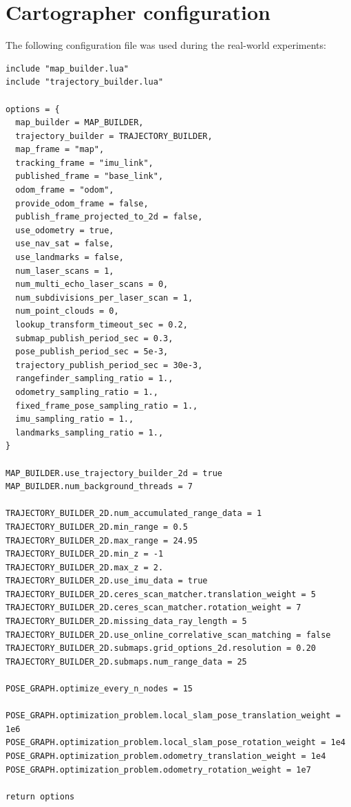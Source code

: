 
\appendix

\chapter{Cartographer configuration} \label{app:cartographer}
\setcounter{page}{1}

The following configuration file was used during the real-world experiments:

\begin{lstlisting}
include "map_builder.lua"
include "trajectory_builder.lua"

options = {
  map_builder = MAP_BUILDER,
  trajectory_builder = TRAJECTORY_BUILDER,
  map_frame = "map",
  tracking_frame = "imu_link",
  published_frame = "base_link",
  odom_frame = "odom",
  provide_odom_frame = false,
  publish_frame_projected_to_2d = false,
  use_odometry = true,
  use_nav_sat = false,
  use_landmarks = false,
  num_laser_scans = 1,
  num_multi_echo_laser_scans = 0,
  num_subdivisions_per_laser_scan = 1,
  num_point_clouds = 0,
  lookup_transform_timeout_sec = 0.2,
  submap_publish_period_sec = 0.3,
  pose_publish_period_sec = 5e-3,
  trajectory_publish_period_sec = 30e-3,
  rangefinder_sampling_ratio = 1.,
  odometry_sampling_ratio = 1.,
  fixed_frame_pose_sampling_ratio = 1.,
  imu_sampling_ratio = 1.,
  landmarks_sampling_ratio = 1.,
}

MAP_BUILDER.use_trajectory_builder_2d = true
MAP_BUILDER.num_background_threads = 7

TRAJECTORY_BUILDER_2D.num_accumulated_range_data = 1
TRAJECTORY_BUILDER_2D.min_range = 0.5
TRAJECTORY_BUILDER_2D.max_range = 24.95
TRAJECTORY_BUILDER_2D.min_z = -1
TRAJECTORY_BUILDER_2D.max_z = 2.
TRAJECTORY_BUILDER_2D.use_imu_data = true
TRAJECTORY_BUILDER_2D.ceres_scan_matcher.translation_weight = 5
TRAJECTORY_BUILDER_2D.ceres_scan_matcher.rotation_weight = 7
TRAJECTORY_BUILDER_2D.missing_data_ray_length = 5
TRAJECTORY_BUILDER_2D.use_online_correlative_scan_matching = false
TRAJECTORY_BUILDER_2D.submaps.grid_options_2d.resolution = 0.20
TRAJECTORY_BUILDER_2D.submaps.num_range_data = 25

POSE_GRAPH.optimize_every_n_nodes = 15

POSE_GRAPH.optimization_problem.local_slam_pose_translation_weight = 1e6
POSE_GRAPH.optimization_problem.local_slam_pose_rotation_weight = 1e4
POSE_GRAPH.optimization_problem.odometry_translation_weight = 1e4
POSE_GRAPH.optimization_problem.odometry_rotation_weight = 1e7

return options
\end{lstlisting}

